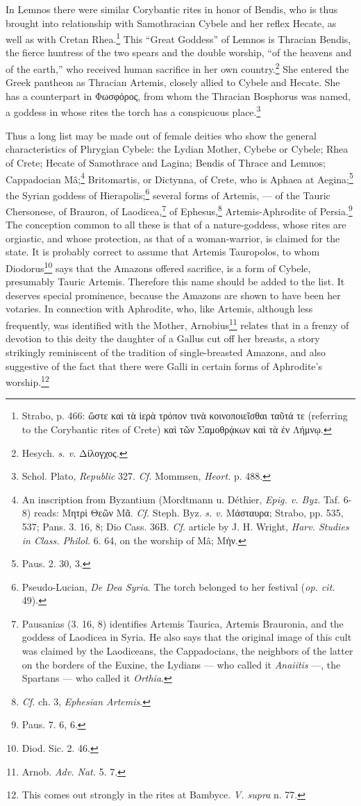 \documentclass[a4paper, 12pt, oneside]{article}
\begin{document}
In Lemnos there were similar Corybantic rites in honor of Bendis, who is thus brought into relationship with Samothracian Cybele and her reflex Hecate, as well as with Cretan Rhea.\footnote{Strabo, p. 466: ὥστε καὶ τὰ ἱερὰ τρόπον τινὰ κοινοποιεῖσθαι ταῦτά τε (referring to the Corybantic rites of Crete) καὶ τῶν Σαμοθρᾴκων καὶ τὰ ἐν Λήμνῳ.} This ``Great Goddess'' of Lemnos is Thracian Bendis, the fierce huntress of the two spears and the double worship, ``of the heavens and of the earth,'' who received human sacrifice in her own country.\footnote{Hesych. \emph{s. v.} Δίλογχος.} She entered the Greek pantheon as Thracian Artemis, closely allied to Cybele and Hecate. She has a counterpart in Φωσφόρος, from whom the Thracian Bosphorus was named, a goddess in whose rites the torch has a conspicuous place.\footnote{Schol. Plato, \emph{Republic} 327. \emph{Cf.} Mommsen, \emph{Heort.} p. 488.}

Thus a long list may be made out of female deities who show the general characteristics of Phrygian Cybele: the Lydian Mother, Cybebe or Cybele; Rhea of Crete; Hecate of Samothrace and Lagina; Bendis of Thrace and Lemnos; Cappadocian Mâ;\footnote{An inscription from Byzantium (Mordtmann u. Déthier, \emph{Epig. v. Byz.} Taf. 6-8) reads: Μητρὶ Θεῶν Μᾶ. \emph{Cf.} Steph. Byz. \emph{s. v.} Μάσταυρα; Strabo, pp. 535, 537; Pans. 3. 16, 8; Dio Cass. 36B. \emph{Cf.} article by J. H. Wright, \emph{Harv. Studies in Class. Philol.} 6. 64, on the worship of Mâ; Μήν.} Britomartis, or Dictynna, of Crete, who is Aphaea at Aegina;\footnote{Paus. 2. 30, 3.} the Syrian goddess of Hierapolis;\footnote{Pseudo-Lucian, \emph{De Dea Syria}. The torch belonged to her festival (\emph{op. cit.} 49).} several forms of Artemis, --- of the Tauric Chersonese, of Brauron, of Laodicea,\footnote{Pausanias (3. 16, 8) identifies Artemis Taurica, Artemis Brauronia, and the goddess of Laodicea in Syria. He also says that the original image of this cult was claimed by the Laodiceans, the Cappadocians, the neighbors of the latter on the borders of the Euxine, the Lydians --- who called it \emph{Anaiitis} ---, the Spartans --- who called it \emph{Orthia}.} of Ephesus,\footnote{\emph{Cf.} ch. 3, \emph{Ephesian Artemis}.} Artemis-Aphrodite of Persia.\footnote{Paus. 7. 6, 6.} The conception common to all these is that of a nature-goddess, whose rites are orgiastic, and whose protection, as that of a woman-warrior, is claimed for the state. It is probably correct to assume that Artemis Tauropolos, to whom Diodorus\footnote{Diod. Sic. 2. 46.} says that the Amazons offered sacrifice, is a form of Cybele, presumably Tauric Artemis. Therefore this name should be added to the list. It deserves special prominence, because the Amazons are shown to have been her votaries. In connection with Aphrodite, who, like Artemis, although less frequently, was identified with the Mother, Arnobius\footnote{Arnob. \emph{Adv. Nat.} 5. 7.} relates that in a frenzy of devotion to this deity the daughter of a Gallus cut off her breasts, a story strikingly reminiscent of the tradition of single-breasted Amazons, and also suggestive of the fact that there were Galli in certain forms of Aphrodite's worship.\footnote{This comes out strongly in the rites at Bambyce. \emph{V. supra} n. 77.}
\end{document}
